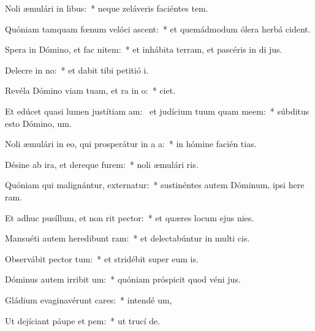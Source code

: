 \item Noli æmulári in libus:~* neque zeláveris faciéntes tem.
\item Quóniam tamquam fœnum velóci ascent:~* et quemádmodum ólera herbá  cident.
\item Spera in Dómino, et fac nitem:~* et inhábita terram, et pascéris in di jus.
\item Delecre in no:~* et dabit tibi petitió  i.
\item Revéla Dómino viam tuam, et ra in o:~*   ciet.
\item Et edúcet quasi lumen justítiam am:~\pscross{} et judícium tuum quam meem:~* súbditus esto Dómino,   um.
\item Noli æmulári in eo, qui prosperátur in a a:~* in hómine facién tias.
\item Désine ab ira, et dereque furem:~* noli æmulári  ris.
\item Quóniam qui malignántur, externatur:~* sustinéntes autem Dóminum, ipsi here ram.
\item Et adhuc pusíllum, et non rit pector:~* et quæres locum ejus   nies.
\item Mansuéti autem heredibunt ram:~* et delectabúntur in multi cis.
\item Observábit pector tum:~* et stridébit super eum  is.
\item Dóminus autem irribit um:~* quóniam próspicit quod véni  jus.
\item Gládium evaginavérunt cares:~* intendé  um,
\item Ut dejíciant páupe et pem:~* ut trucí  de.
